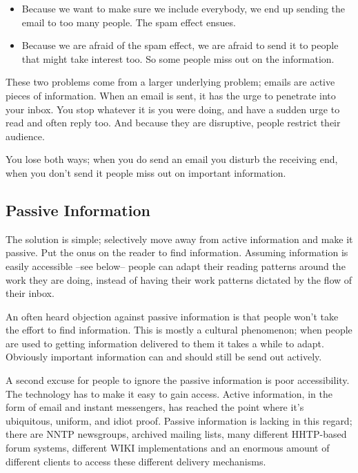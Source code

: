 \documentclass[twocolumn]{paper}
\begin{document}
\begin{itemize}
    \item Because we want to make sure we include everybody, we end
    up sending the email to too many people. The spam effect ensues.
    \item Because we are afraid of the spam effect, we are afraid to
    send it to people that might take interest too. So some people
    miss out on the information.
\end{itemize}

These two problems come from a larger underlying problem; emails are
active pieces of information. When an email is sent, it has the urge
to penetrate into your inbox. You stop whatever it is you were
doing, and have a sudden urge to read and often reply too. And
because they are disruptive, people restrict their audience.

You lose both ways; when you do send an email you disturb the
receiving end, when you don't send it people miss out on important
information.

\subsection{Passive Information}

The solution is simple; selectively move away from active
information and make it passive. Put the onus on the reader to find
information. Assuming information is easily accessible --see below--
people can adapt their reading patterns around the work they are
doing, instead of having their work patterns dictated by the flow of
their inbox.

An often heard objection against passive information is that people
won't take the effort to find information. This is mostly a cultural
phenomenon; when people are used to getting information delivered to
them it takes a while to adapt. Obviously important information can
and should still be send out actively.

A second excuse for people to ignore the passive information is poor
accessibility. The technology has to make it easy to gain access.
Active information, in the form of email and instant messengers, has
reached the point where it's ubiquitous, uniform, and idiot proof.
Passive information is lacking in this regard; there are NNTP
newsgroups, archived mailing lists, many different HHTP-based forum
systems, different WIKI implementations and an enormous amount of
different clients to access these different delivery mechanisms.
\end{document}

